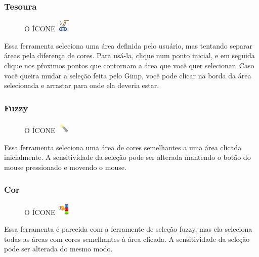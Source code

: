 \documentclass[12pt,onecolumn]{article}
\begin{document}
      \subsubsection{Tesoura}
      \begin{figure}[H]
        O ÍCONE
        \includegraphics{gimp-icons/stock-tool-iscissors-22.png}
        \label{fig:scissorsselect}
      \end{figure}
      Essa ferramenta seleciona uma área definida pelo usuário, mas tentando separar áreas pela
      diferença de cores. Para usá-la, clique num ponto inicial, e em seguida clique nos pŕoximos
      pontos que contornam a área que você quer selecionar. Caso você queira mudar a seleção feita
      pelo Gimp, você pode clicar na borda da área selecionada e arrastar para onde ela deveria 
      estar.

      \subsubsection{Fuzzy}
      \begin{figure}[H]
        O ÍCONE
        \includegraphics{gimp-icons/stock-tool-fuzzy-select-22.png}
        \label{fig:magicselect}
      \end{figure}
      Essa ferramenta seleciona uma área de cores semelhantes a uma área clicada inicialmente.
      A sensitividade da seleção pode ser alterada mantendo o botão do mouse pressionado e movendo
      o mouse.

      \subsubsection{Cor}
      \begin{figure}[H]
        O ÍCONE
        \includegraphics{gimp-icons/stock-tool-by-color-select-22.png}
        \label{fig:colorselect}
      \end{figure}
      Essa ferramenta é parecida com a ferramente de seleção fuzzy, mas ela seleciona todas as áreas
      com cores semelhantes à área clicada. A sensitividade da seleção pode ser alterada do mesmo
      modo.
\end{document}
